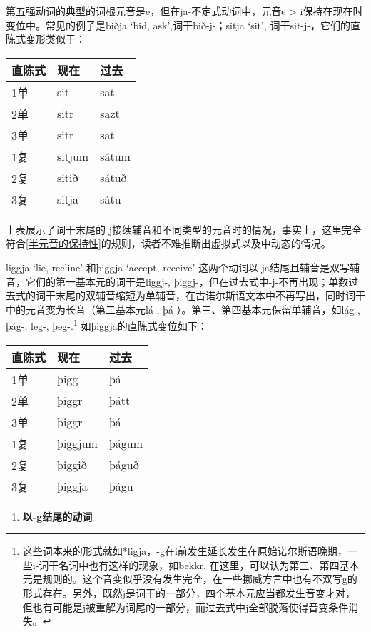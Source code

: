 第五强动词的典型的词根元音是e，但在ja-不定式动词中，元音e \textgreater{}
i保持在现在时变位中。常见的例子是biðja `bid, ask‌',词干bið-j-；sitja
`sit‌', 词干sit-j-，它们的直陈式变形类似于：

\begin{longtable}{lll}
  \toprule
  直陈式 & 现在   & 过去  \\
  \midrule
  \endhead
  \bottomrule
  \endfoot
  1单    & sit    & sat   \\
  2单    & sitr   & sazt  \\
  3单    & sitr   & sat   \\
  1复    & sitjum & sátum \\
  2复    & sitið  & sátuð \\
  3复    & sitja  & sátu  \\
\end{longtable}

上表展示了词干末尾的-j接续辅音和不同类型的元音时的情况，事实上，这里完全符合\ref{半元音的保持性}的规则，读者不难推断出虚拟式以及中动态的情况。

liggja `lie, recline‌' 和þiggja `accept, receive‌'
这两个动词以-ja结尾且辅音是双写辅音，它们的第一基本元的词干是liggj-,
þiggj-，但在过去式中-j-不再出现；单数过去式的词干末尾的双辅音缩短为单辅音，在古诺尔斯语文本中不再写出，同时词干中的元音变为长音（第二基本元lá-,
þá-）。第三、第四基本元保留单辅音，如lág-, þág-; leg-, þeg-.\footnote{这些词本来的形式就如*ligja，-g在i前发生延长发生在原始诺尔斯语晚期，一些i-词干名词中也有这样的现象，如bekkr.
  在这里，可以认为第三、第四基本元是规则的。这个音变似乎没有发生完全，在一些挪威方言中也有不双写g的形式存在。另外，既然j是词干的一部分，四个基本元应当都发生音变才对，但也有可能是j被重解为词尾的一部分，而过去式中j全部脱落使得音变条件消失。}
如þiggja的直陈式变位如下：

\begin{longtable}{lll}
  \toprule
  直陈式 & 现在    & 过去  \\
  \midrule
  \endhead
  \bottomrule
  \endfoot
  1单    & þigg    & þá    \\
  2单    & þiggr   & þátt  \\
  3单    & þiggr   & þá    \\
  1复    & þiggjum & þágum \\
  2复    & þiggið  & þáguð \\
  3复    & þiggja  & þágu  \\
\end{longtable}

\begin{enumerate}
  \def\labelenumi{\arabic{enumi})}
  \setcounter{enumi}{1}
  \item
        \textbf{以-g结尾的动词}
\end{enumerate}

